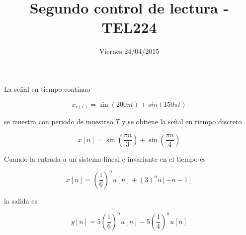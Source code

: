 \documentclass[addpoints]{exam}
\begin{document}
\headrule

\title{Segundo control de lectura - TEL224}
\date{Viernes 24/04/2015}
\maketitle

\vspace{0.1in}

\begin{questions}

\question

La señal en tiempo continuo

$$x_{c(t)} = \sin (200 \pi t) + sin (150 \pi t)$$

se muestra con periodo de muestreo \(T\) y se obtiene la señal en tiempo discreto

$$x[n] = \sin\left(\frac{\pi n}{3}\right) + \sin\left(\frac{\pi n}{4}\right)$$


\question

Cuando la entrada a un sistema lineal e invariante en el tiempo es

$$x[n] = \left(\frac{1}{6}\right)^{n} u[n] + \left(3\right)^{n} u[-n-1]$$

la salida es

$$y[n] = 5 \left(\frac{1}{6}\right)^{n} u[n] - 5 \left(\frac{1}{4}\right)^{n} u[n]$$

\begin{parts}

\end{parts}
\end{questions}
\end{document}
